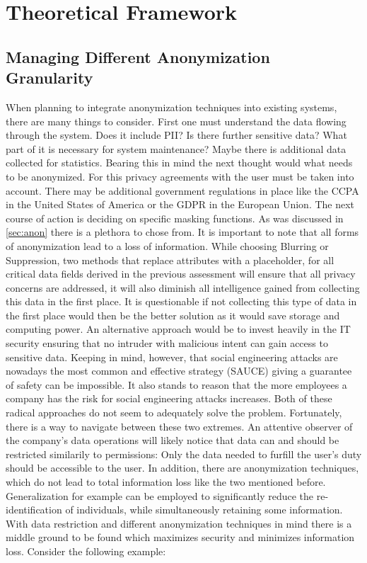 \chapter{Theoretical Framework\label{cha:chapter3}}

\section{Managing Different Anonymization Granularity}
When planning to integrate anonymization techniques into existing systems, there are many things to consider. First one must understand the data flowing through the system.
Does it include \ac{PII}? Is there further sensitive data? What part of it is necessary for system maintenance? Maybe there is additional data collected for statistics.
Bearing this in mind the next thought would what needs to be anonymized. For this privacy agreements with the user must be taken into account. There may be additional government regulations in place like the \ac{CCPA} in the United States of America or the \ac{GDPR} in the European Union. 
The next course of action is deciding on specific masking functions. As was discussed in \ref{sec:anon} there is a plethora to chose from. It is important to note that all forms of anonymization lead to a loss of information. 
While choosing Blurring or Suppression, two methods that replace attributes with a placeholder, for all critical data fields derived in the previous assessment will ensure that all privacy concerns are addressed, it will also diminish all intelligence gained from collecting this data in the first place. It is questionable if not collecting this type of data in the first place would then be the better solution as it would save storage and computing power. 
An alternative approach would be to invest heavily in the IT security ensuring that no intruder with malicious intent can gain access to sensitive data. Keeping in mind, however, that social engineering attacks are nowadays the most common and effective strategy (SAUCE) giving a guarantee of safety can be impossible. It also stands to reason that the more employees a company has the risk for social
engineering attacks increases. Both of these radical approaches do not seem to adequately solve the problem. Fortunately, there is a way to navigate between these two extremes. An attentive observer of the company's data operations will likely notice that data can and should be restricted similarily to permissions: Only the data needed to furfill the user's duty should be accessible to the user. 
In addition, there are anonymization techniques, which do not lead to total information loss like the two mentioned before. Generalization for example can be employed to significantly reduce the re-identification of individuals, while simultaneously retaining some information.
With data restriction and different anonymization techniques in mind there is a middle ground to be found which maximizes security and minimizes information loss. Consider the following example:

